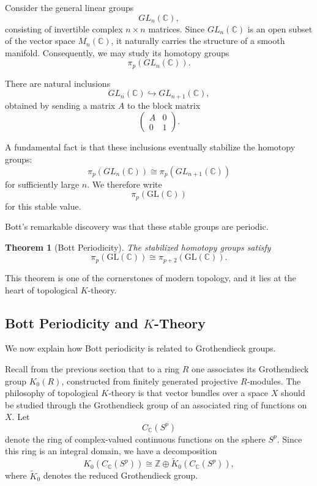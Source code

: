\documentclass[12pt,reqno]{amsart}
\theoremstyle{plain}
\numberwithin{equation}{section}
\newtheorem{theorem}{Theorem}[section]
\begin{document}
Consider the general linear groups
\[
GL_n(\mathbb C),
\]
consisting of invertible complex $n\times n$ matrices. Since $GL_n(\mathbb C)$ is an open subset of the vector space $M_n(\mathbb C)$, it naturally carries the structure of a smooth manifold. Consequently, we may study its homotopy groups
\[
\pi_p(GL_n(\mathbb C)).
\]

There are natural inclusions
\[
GL_n(\mathbb C)\hookrightarrow GL_{n+1}(\mathbb C),
\]
obtained by sending a matrix $A$ to the block matrix
\[
\begin{pmatrix}
A & 0\\
0 & 1
\end{pmatrix}.
\]

A fundamental fact is that these inclusions eventually stabilize the homotopy groups:
\[
\pi_p(GL_n(\mathbb C))
\cong
\pi_p(GL_{n+1}(\mathbb C))
\]
for sufficiently large $n$. We therefore write
\[
\pi_p(\mathrm{GL}(\mathbb C))
\]
for this stable value.

Bott's remarkable discovery was that these stable groups are periodic.

\begin{theorem}[Bott Periodicity]\label{thm: bott}
The stabilized homotopy groups satisfy
\[
\pi_p(\mathrm{GL}(\mathbb C))
\cong
\pi_{p+2}(\mathrm{GL}(\mathbb C)).
\]
\end{theorem}

This theorem is one of the cornerstones of modern topology, and it lies at the heart of topological $K$-theory.

\subsection{Bott Periodicity and $K$-Theory}

We now explain how Bott periodicity is related to Grothendieck groups.

Recall from the previous section that to a ring $R$ one associates its Grothendieck group $K_0(R)$, constructed from finitely generated projective $R$-modules. The philosophy of topological $K$-theory is that vector bundles over a space $X$ should be studied through the Grothendieck group of an associated ring of functions on $X$. Let
\[
C_{\mathbb C}(S^p)
\]
denote the ring of complex-valued continuous functions on the sphere $S^p$. Since this ring is an integral domain, we have a decomposition
\[
K_0(C_{\mathbb C}(S^p))
\cong
\mathbb Z\oplus \widetilde K_0(C_{\mathbb C}(S^p)),
\]
where $\widetilde K_0$ denotes the reduced Grothendieck group.
\end{document}
